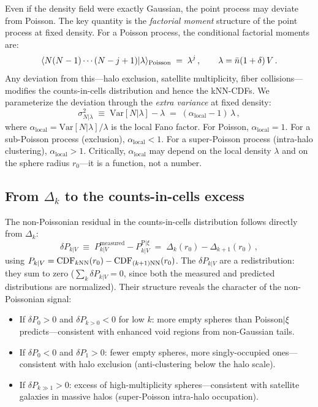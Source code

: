 Even if the density field were exactly Gaussian, the point process may deviate from Poisson.  The key quantity is the \emph{factorial moment} structure of the point process at fixed density.  For a Poisson process, the conditional factorial moments are:
\begin{equation}
  \langle N(N-1)\cdots(N-j+1) | \lambda \rangle_{\mathrm{Poisson}} \;=\; \lambda^j\,,\qquad \lambda = \bar{n}(1+\delta)\,V\,.
  \label{eq:poisson_factorial}
\end{equation}
Any deviation from this---halo exclusion, satellite multiplicity, fiber collisions---modifies the counts-in-cells distribution and hence the kNN-CDFs.  We parameterize the deviation through the \emph{extra variance} at fixed density:
\begin{equation}
  \sigma^2_{N|\lambda} \;\equiv\; \mathrm{Var}[N | \lambda] - \lambda \;=\; (\alpha_{\mathrm{local}} - 1)\,\lambda\,,
  \label{eq:extra_variance}
\end{equation}
where $\alpha_{\mathrm{local}} = \mathrm{Var}[N|\lambda]/\lambda$ is the local Fano factor.  For Poisson, $\alpha_{\mathrm{local}} = 1$.  For a sub-Poisson process (exclusion), $\alpha_{\mathrm{local}} < 1$.  For a super-Poisson process (intra-halo clustering), $\alpha_{\mathrm{local}} > 1$.  Critically, $\alpha_{\mathrm{local}}$ may depend on the local density $\lambda$ and on the sphere radius $r_0$---it is a function, not a number.

\subsection{From $\Delta_k$ to the counts-in-cells excess}
\label{sec:delta_to_cic}

The non-Poissonian residual in the counts-in-cells distribution follows directly from $\Delta_k$:
\begin{equation}
  \delta P_{k|V} \;\equiv\; P^{\mathrm{measured}}_{k|V} - P^{\mathrm{P}|\xi}_{k|V} \;=\; \Delta_k(r_0) - \Delta_{k+1}(r_0)\,,
  \label{eq:delta_Pk}
\end{equation}
using $P_{k|V} = \mathrm{CDF}_{k\mathrm{NN}}(r_0) - \mathrm{CDF}_{(k+1)\mathrm{NN}}(r_0)$.  The $\delta P_{k|V}$ are a redistribution: they sum to zero ($\sum_k \delta P_{k|V} = 0$, since both the measured and predicted distributions are normalized).  Their structure reveals the character of the non-Poissonian signal:
\begin{itemize}[nosep]
  \item If $\delta P_0 > 0$ and $\delta P_{k>0} < 0$ for low $k$: more empty spheres than Poisson$|\xi$ predicts---consistent with enhanced void regions from non-Gaussian tails.
  \item If $\delta P_0 < 0$ and $\delta P_{1} > 0$: fewer empty spheres, more singly-occupied ones---consistent with halo exclusion (anti-clustering below the halo scale).
  \item If $\delta P_{k \gg 1} > 0$: excess of high-multiplicity spheres---consistent with satellite galaxies in massive halos (super-Poisson intra-halo occupation).
\end{itemize}

